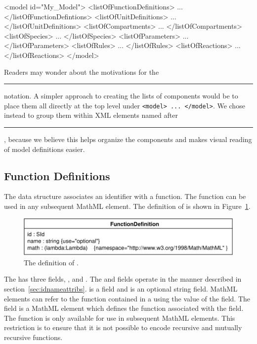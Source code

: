 \documentclass[10pt]{cekarticle}
\newcommand{\vref}[1]{\ref{#1}}
\begin{document}
\begin{example}
<model id="My_Model">
    <listOfFunctionDefinitions>
        ...
    </listOfFunctionDefintions>
    <listOfUnitDefinitions>
        ...
    </listOfUnitDefinitions>
    <listOfCompartments>
        ...
    </listOfCompartments>
    <listOfSpecies>
        ...
    </listOfSpecies>
    <listOfParameters>
        ...
    </listOfParameters>
    <listOfRules>
        ...
    </listOfRules>
    <listOfReactions>
        ...
    </listOfReactions>
</model>
\end{example}

Readers may wonder about the motivations for the
\rule{0.5in}{0.5pt} notation.  A simpler approach to
creating the lists of components would be to place them all directly
at the top level under \texttt{<model> ... </model>}.  We chose instead to
group them within XML elements named after
\rule{0.5in}{0.5pt}, because we believe this helps
organize the components and makes visual reading of model definitions
easier.

\subsection{Function Definitions}
\label{sec:functions}

The  data structure associates an identifier
with a function.  The function can be used in any subsequent
MathML  element.  The definition of
 is shown in
Figure~\vref{fig:mathdefinition}.

\begin{figure}[htb]
  \centering
  \includegraphics[scale = 0.68]{mathdefinition}
  \caption{The definition of .}
  \label{fig:mathdefinition}
\end{figure}

The  has three fields, ,
 and . The  and
 fields operate in the manner described in
section~\ref{sec:idnameattribs}.   is a 
field and  is an optional string field. MathML
elements can refer to the function contained in a
 using the value of the  field.
The  field is a MathML  element
which defines the function associated with the  field.
The function is only available for use in subsequent MathML
elements.  This restriction is to ensure that it is not possible to encode recursive and mutually recursive functions.
\end{document}
